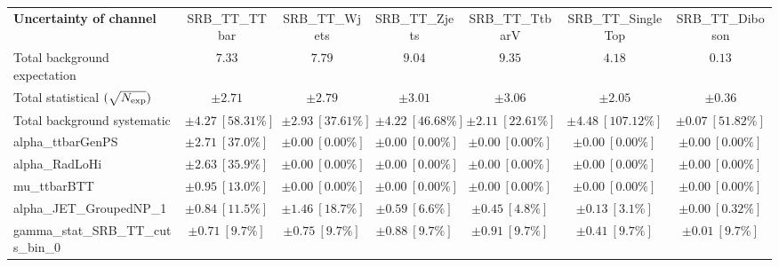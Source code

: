 
\begin{sidewaystable}
\begin{center}
\setlength{\tabcolsep}{0.0pc}
\begin{tabular*}{\textwidth}{@{\extracolsep{\fill}}lcccccc}
\noalign{\smallskip}\hline\noalign{\smallskip}
{\bf Uncertainty of channel}                                    & SRB\_TT\_TTbar            & SRB\_TT\_Wjets            & SRB\_TT\_Zjets            & SRB\_TT\_TtbarV            & SRB\_TT\_SingleTop            & SRB\_TT\_Diboson            \\
\noalign{\smallskip}\hline\noalign{\smallskip}
Total background expectation             &  $7.33$        &  $7.79$        &  $9.04$        &  $9.35$        &  $4.18$        &  $0.13$       \\
\noalign{\smallskip}\hline\noalign{\smallskip}
Total statistical $(\sqrt{N_{\rm exp}})$              & $\pm 2.71$        & $\pm 2.79$        & $\pm 3.01$        & $\pm 3.06$        & $\pm 2.05$        & $\pm 0.36$       \\
Total background systematic               & $\pm 4.27\ [58.31\%] $        & $\pm 2.93\ [37.61\%] $        & $\pm 4.22\ [46.68\%] $        & $\pm 2.11\ [22.61\%] $        & $\pm 4.48\ [107.12\%] $        & $\pm 0.07\ [51.82\%] $             \\
\noalign{\smallskip}\hline\noalign{\smallskip}
\noalign{\smallskip}\hline\noalign{\smallskip}
alpha\_ttbarGenPS         & $\pm 2.71\ [37.0\%] $          & $\pm 0.00\ [0.00\%] $          & $\pm 0.00\ [0.00\%] $          & $\pm 0.00\ [0.00\%] $          & $\pm 0.00\ [0.00\%] $          & $\pm 0.00\ [0.00\%] $       \\
alpha\_RadLoHi         & $\pm 2.63\ [35.9\%] $          & $\pm 0.00\ [0.00\%] $          & $\pm 0.00\ [0.00\%] $          & $\pm 0.00\ [0.00\%] $          & $\pm 0.00\ [0.00\%] $          & $\pm 0.00\ [0.00\%] $       \\
mu\_ttbarBTT         & $\pm 0.95\ [13.0\%] $          & $\pm 0.00\ [0.00\%] $          & $\pm 0.00\ [0.00\%] $          & $\pm 0.00\ [0.00\%] $          & $\pm 0.00\ [0.00\%] $          & $\pm 0.00\ [0.00\%] $       \\
alpha\_JET\_GroupedNP\_1         & $\pm 0.84\ [11.5\%] $          & $\pm 1.46\ [18.7\%] $          & $\pm 0.59\ [6.6\%] $          & $\pm 0.45\ [4.8\%] $          & $\pm 0.13\ [3.1\%] $          & $\pm 0.00\ [0.32\%] $       \\
gamma\_stat\_SRB\_TT\_cuts\_bin\_0         & $\pm 0.71\ [9.7\%] $          & $\pm 0.75\ [9.7\%] $          & $\pm 0.88\ [9.7\%] $          & $\pm 0.91\ [9.7\%] $          & $\pm 0.41\ [9.7\%] $          & $\pm 0.01\ [9.7\%] $       \\

\end{tabular*}
\end{center}
\end{sidewaystable}
